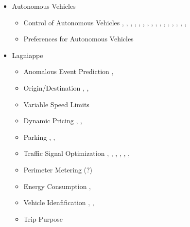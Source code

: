\begin{itemize}
	\item Autonomous Vehicles
	\begin{itemize}

	\item Control of Autonomous Vehicles 
		\cite{AN2020102777},
		\cite{BAUTISTAMONTESANO2022103662},
		\cite{CAO2022103656},
		\cite{DONG2021103192},
		\cite{DU2022103489}, 
		\cite{GUO2021102980},
		\cite{KALATIAN2021102962},
		\cite{LAZAR2021103258},
		\cite{LI2022103452},
		\cite{SHI2021103421}, 
		\cite{WANG2022103478},
		\cite{WEGENER2021102967},
		\cite{WU2020102649},
		\cite{YE2019155}, 
		\cite{ZHANG2021103140}, 
		\cite{ZHU2020102662},
	\item Preferences for Autonomous Vehicles
		\cite{ZHANG2020102774}
	\end{itemize}
		
	\item Lagniappe
	\begin{itemize}		
	\item Anomalous Event Prediction
		\cite{YANG2021102862},
	\item Origin/Destination
		\cite{MA2020102747},
		\cite{SUN2021103114},
		
	\item Variable Speed Limits 
		\cite{WU2020102649}
		
	\item Dynamic Pricing 
		\cite{GENSER2022103485},
		\cite{HAN2022103584},
		\cite{PANDEY2020102715}
	\item Parking
		\cite{MANTOUKA2021103173},
		\cite{YANG2019248},
		\cite{ZHANG2022103624}
	\item Traffic Signal Optimization 
		\cite{LEE2019117},
		\cite{LI2021103059}, 
		\cite{WANG2021103046},
		\cite{WANG2022103670},
		\cite{WU2019246},
		\cite{YOON2021103321},
	\item Perimeter Metering (?) 
		\cite{ZHOU2021102949}
	\item Energy Consumption
		\cite{QI201967},
		\cite{YAO2019276}
	\item Vehicle Idenfification
		\cite{DABIRI2020102644},
		\cite{LI2021102946},
	\item Trip Purpose
		\cite{FAROQI2021103131}
	\end{itemize}
	

\end{itemize}

